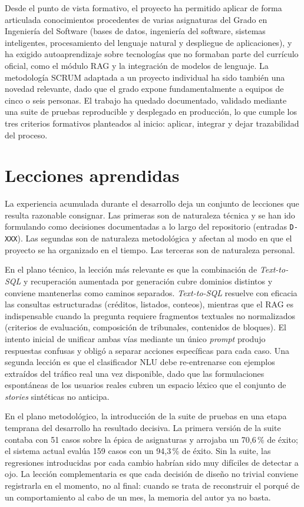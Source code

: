Desde el punto de vista formativo, el proyecto ha permitido aplicar de forma articulada conocimientos procedentes de varias asignaturas del Grado en Ingeniería del Software (bases de datos, ingeniería del software, sistemas inteligentes, procesamiento del lenguaje natural y despliegue de aplicaciones), y ha exigido autoaprendizaje sobre tecnologías que no formaban parte del currículo oficial, como el módulo RAG y la integración de modelos de lenguaje. La metodología SCRUM adaptada a un proyecto individual ha sido también una novedad relevante, dado que el grado expone fundamentalmente a equipos de cinco o seis personas. El trabajo ha quedado documentado, validado mediante una suite de pruebas reproducible y desplegado en producción, lo que cumple los tres criterios formativos planteados al inicio: aplicar, integrar y dejar trazabilidad del proceso.

\section{Lecciones aprendidas}\label{sec:conc-lecciones}

La experiencia acumulada durante el desarrollo deja un conjunto de lecciones que resulta razonable consignar. Las primeras son de naturaleza técnica y se han ido formulando como decisiones documentadas a lo largo del repositorio (entradas \texttt{D-XXX}). Las segundas son de naturaleza metodológica y afectan al modo en que el proyecto se ha organizado en el tiempo. Las terceras son de naturaleza personal.

En el plano técnico, la lección más relevante es que la combinación de \textit{Text-to-SQL} y recuperación aumentada por generación cubre dominios distintos y conviene mantenerlas como caminos separados. \textit{Text-to-SQL} resuelve con eficacia las consultas estructuradas (créditos, listados, conteos), mientras que el RAG es indispensable cuando la pregunta requiere fragmentos textuales no normalizados (criterios de evaluación, composición de tribunales, contenidos de bloques). El intento inicial de unificar ambas vías mediante un único \textit{prompt} produjo respuestas confusas y obligó a separar acciones específicas para cada caso. Una segunda lección es que el clasificador NLU debe re-entrenarse con ejemplos extraídos del tráfico real una vez disponible, dado que las formulaciones espontáneas de los usuarios reales cubren un espacio léxico que el conjunto de \textit{stories} sintéticas no anticipa.

En el plano metodológico, la introducción de la suite de pruebas en una etapa temprana del desarrollo ha resultado decisiva. La primera versión de la suite contaba con 51 casos sobre la épica de asignaturas y arrojaba un 70,6\,\% de éxito; el sistema actual evalúa 159 casos con un 94,3\,\% de éxito. Sin la suite, las regresiones introducidas por cada cambio habrían sido muy difíciles de detectar a ojo. La lección complementaria es que cada decisión de diseño no trivial conviene registrarla en el momento, no al final: cuando se trata de reconstruir el porqué de un comportamiento al cabo de un mes, la memoria del autor ya no basta.

